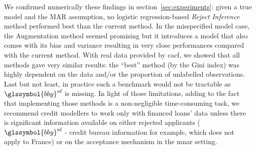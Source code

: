 We confirmed numerically these findings in section~\ref{sec:experiments}: given a true model and the MAR assumption, no logistic regression-based \textit{Reject Inference} method performed best than the current method. In the misspecified model case, the Augmentation method seemed promising but it introduces a model that also comes with its bias and variance resulting in very close performances compared with the current method. With real data provided by \gls{cacf}, we showed that all methods gave very similar results: the ``best'' method (by the Gini index) was highly dependent on the data and/or the proportion of unlabelled observations. Last but not least, in practice such a benchmark would not be tractable as $\glssymbol{bby}^{\text{nf}}$ is missing. In light of those limitations, adding to the fact that implementing those methods is a non-negligible time-consuming task, we recommend credit modellers to work only with financed loans' data unless there is significant information available on either rejected applicants ($\glssymbol{bby}^{\text{nf}}$ - credit bureau information for example, which does not apply to France) or on the acceptance mechanism in the \gls{mnar} setting.


\printbibliography[heading=subbibliography, title=References of Chapter 2]
